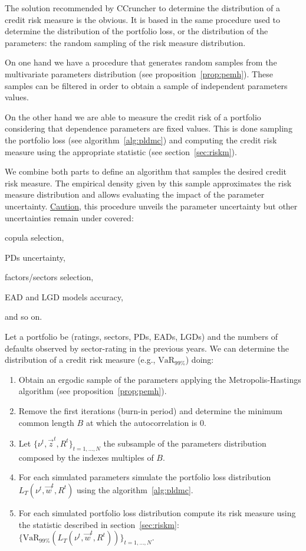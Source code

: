 \documentclass[11pt,fleqn]{book} %
\begin{document}
The solution recommended by CCruncher to determine the distribution of a
credit risk measure is the obvious. It is based in the same procedure 
used to determine the distribution of the portfolio loss, or the distribution 
of the parameters: the random sampling of the risk measure distribution. 

On one hand we have a procedure that generates random samples from the 
multivariate parameters distribution (see proposition~\ref{prop:pemh}).
These samples can be filtered in order to obtain a sample of independent
parameters values.

On the other hand we are able to measure the credit risk of a portfolio 
considering that dependence parameters are fixed values. This is done 
sampling the portfolio loss (see algorithm~\ref{alg:pldmc}) and computing 
the credit risk measure using the appropriate statistic (see 
section~\ref{sec:riskm}).

We combine both parts to define an algorithm that samples the desired
credit risk measure. The empirical density given by this sample 
approximates the risk measure distribution and allows evaluating the 
impact of the parameter uncertainty. \ul{Caution}, this procedure unveils 
the parameter uncertainty but other uncertainties remain under covered:
\begin{inparaenum}[1)]
	\item copula selection, 
	\item PDs uncertainty,
	\item factors/sectors selection,
	\item EAD and LGD models accuracy,
	\item and so on.
\end{inparaenum}

\begin{algorithm}
	\label{alg:crmd}
	Let a portfolio be (ratings, sectors, PDs, EADs, LGDs) and the numbers 
	of defaults observed by sector-rating in the previous years. We can
	determine the distribution of a credit risk measure 
	(e.g., $\text{VaR}_{99\%}$) doing:
	\begin{enumerate}
		\item Obtain an ergodic sample of the parameters applying the
		Metropolis-Hastings algorithm (see proposition~\ref{prop:pemh}).
		\item Remove the first iterations (burn-in period) and determine
		the minimum common length $B$ at which the autocorrelation is $0$.
		\item Let $\{\nu^t, \vec{z}^t, R^t\}_{t=1,\dots,N}$ the subsample
		of the parameters distribution composed by the indexes multiples 
		of $B$.
		\item For each simulated parameters simulate the portfolio loss 
		distribution $L_T(\nu^t,\vec{w}^t,R^t)$ using the algorithm~\ref{alg:pldmc}.
		\item For each simulated portfolio loss distribution compute its 
		risk measure using the statistic described in section~\ref{sec:riskm}:
		$\{\text{VaR}_{99\%}(L_T(\nu^t,\vec{w}^t,R^t))\}_{t=1,\dots,N}$.
	\end{enumerate}
\end{algorithm}
\end{document}
